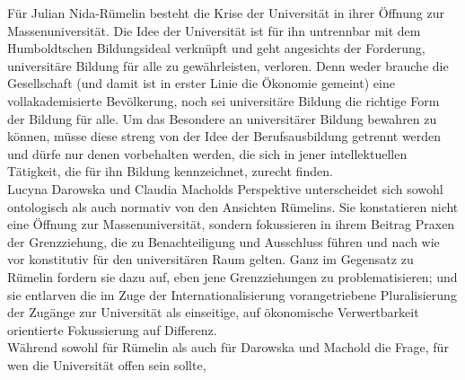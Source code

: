   Für Julian Nida-Rümelin\footnotemark {} besteht die Krise
  der Universität in ihrer Öffnung zur Massenuniversität. Die Idee der
  Universität ist für ihn untrennbar mit dem \glqq Humboldtschen Bildungsideal\grqq\footnotemark {} verknüpft und geht angesichts der
Forderung, universitäre Bildung für alle zu gewährleisten, verloren. Denn weder
brauche die Gesellschaft (und damit ist in erster Linie die Ökonomie gemeint)
eine vollakademisierte Bevölkerung, noch sei universitäre Bildung die richtige
Form der Bildung für alle. Um das Besondere an universitärer Bildung bewahren
zu können, müsse diese streng von der Idee der Berufsausbildung getrennt werden
und dürfe nur denen vorbehalten werden, die sich in jener intellektuellen
Tätigkeit, die für ihn Bildung kennzeichnet, zurecht finden.\\
Lucyna Darowska und Claudia Macholds\footnotemark {} Perspektive unterscheidet sich sowohl ontologisch als
auch normativ von den Ansichten Rümelins. Sie konstatieren nicht eine Öffnung
zur Massenuniversität, sondern fokussieren in ihrem Beitrag Praxen der
Grenzziehung, die zu Benachteiligung und Ausschluss führen und nach wie vor
konstitutiv für den universitären Raum gelten. Ganz im Gegensatz zu Rümelin
fordern sie dazu auf, eben jene Grenzziehungen zu problematisieren; und sie
entlarven die im Zuge der Internationalisierung vorangetriebene Pluralisierung
der Zugänge zur Universität als einseitige, auf ökonomische Verwertbarkeit
orientierte Fokussierung auf Differenz.\\
Während sowohl für Rümelin als auch
für Darowska und Machold die Frage, für wen die Universität offen sein sollte,
